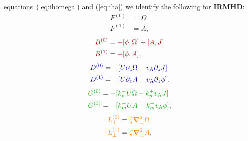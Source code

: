 \documentclass[12pt, letterpaper, oneside, leqno, openright]{memoir}
\newcommand{\irmhd}{\textbf{IRMHD}}
\begin{document}
equations~(\ref{eq:ihomega}) and (\ref{eq:iha}) we identify the 
following for \irmhd:
%
\begin{subequations}
\begin{align}
  F^{(0)} &= \Omega                                                                                   \label{eq:irmhdfzero} \\
  F^{(1)} &=  A,                                                                                      \label{eq:irmhdfone}
\end{align}
\end{subequations}
%
\begin{subequations}
\begin{align}
  {\color{red!65!black}B^{(0)}} &= {\color{red!65!black}-[\phi,\Omega]} + {\color{red!65!black}[A,J]} \label{eq:irmhdbzero}  \\
  {\color{red!65!black}B^{(1)}} &= {\color{red!65!black}-[\phi,A]},                                   \label{eq:irmhdbone}
\end{align}
\end{subequations}
%                                   
\begin{subequations}
\begin{align}
  {\color{blue!65!black}D^{(0)}} &= {\color{blue!65!black} -[U\pardz\Omega - \magvalfven\pardz J]}    \label{eq:irmhddzero}   \\
  {\color{blue!65!black}D^{(1)}} &= {\color{blue!65!black} -[U\pardz A     - \magvalfven\pardz\phi]}, \label{eq:irmhddone}
\end{align}
\end{subequations}
%                                   
\begin{subequations}
\begin{align}
  {\color{green!65!black}G^{(0)}} &= {\color{green!65!black} - [\kpm U\Omega - \kpp\magvalfven    J]}    \label{eq:irmhdgzero} \\
  {\color{green!65!black}G^{(1)}} &= {\color{green!65!black} - [\kmm U A     - \kmp\magvalfven \phi]},   \label{eq:irmhdgone}
\end{align}
\end{subequations}
%
\begin{subequations}
\begin{align}
  {\color{orange}L^{(0)}_\perp} &={\color{orange}\zeta\boldsymbol{\nabla}_\perp^2\Omega} \label{eq:irmhdlzero} \\
  {\color{orange}L^{(1)}_\perp} &={\color{orange}\zeta\boldsymbol{\nabla}_\perp^2 A},    \label{eq:irmhdlone}
\end{align}
\end{subequations}
\end{document}
